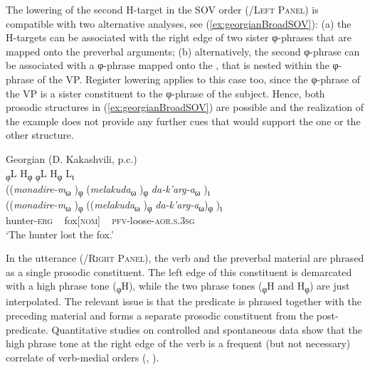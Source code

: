 \documentclass[output=paper,colorlinks,citecolor=brown]{langscibook}
\begin{document}
 The  lowering of the second H-target in the SOV order (/\textsc{Left Panel}) is compatible with two alternative analyses, see (\ref{ex:georgianBroadSOV}): (a) the H-targets can be associated with the right edge of two sister φ-phrases that are mapped onto the preverbal arguments; (b) alternatively, the second φ-phrase can be associated with a φ-phrase mapped onto the , that is nested within the φ-phrase of the VP. Register lowering applies to this case too, since the φ-phrase of the VP is a sister constituent to the φ-phrase of the subject. Hence, both prosodic structures in (\ref{ex:georgianBroadSOV}) are possible and the realization of the example does not provide any further cues that would support the one or the other structure.

\ea \label{ex:georgianBroadSOV}
    Georgian (D. Kakashvili, p.c.) \\
    \gllll \textup{\textsubscript{φ}L} \textup{H\textsubscript{φ}} \textup{\textsubscript{φ}L} \textup{H\textsubscript{φ}} {} \textup{L\textsubscript{ι}} \\
    ((\textit{monadire-m}\textsubscript{ω} )\textsubscript{φ} (\textit{melakuda}\textsubscript{ω} )\textsubscript{φ} \textit{da-k’arg-a}\textsubscript{ω} )\textsubscript{ι}\\
    ((\textit{monadire-m}\textsubscript{ω} )\textsubscript{φ} ((\textit{melakuda}\textsubscript{ω} )\textsubscript{φ} \textit{da-k’arg-a}\textsubscript{ω})\textsubscript{φ} )\textsubscript{ι}\\
     hunter-\textsc{erg} ~ fox[\textsc{nom}] ~ \textsc{pfv}-loose-\textsc{aor}.\textsc{s}.\textsc{3sg}\\
\glt ‘The hunter lost the fox.'
\z 

In the  utterance (/\textsc{Right Panel}), the verb and the preverbal material are phrased as a single prosodic constituent. The left edge of this constituent is demarcated with a high phrase tone (\textsubscript{φ}H), while the two phrase tones (\textsubscript{φ}H and H\textsubscript{φ}) are just interpolated. The relevant issue is that the predicate is phrased together with the preceding material and forms a separate prosodic constituent from the post-predicate. Quantitative studies on controlled and spontaneous data show that the high phrase tone at the right edge of the verb is a frequent (but not necessary) correlate of verb-medial orders (\citealt[]{skopeteas_Fery_focus_2010}, \citealt[]{Skopeteasetal_Information_2018}).
\end{document}
